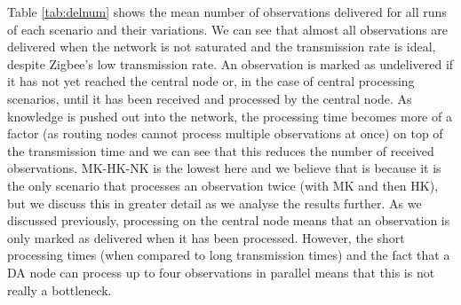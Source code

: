 Table \ref{tab:delnum} shows the mean number of observations delivered for all runs of each scenario and their variations. We can see that almost all observations are delivered when the network is not saturated and the transmission rate is ideal, despite Zigbee's low transmission rate. An observation is marked as undelivered if it has not yet reached the central node or, in the case of central processing scenarios, until it has been received and processed by the central node. As knowledge is pushed out into the network, the processing time becomes more of a factor (as routing nodes cannot process multiple observations at once) on top of the transmission time and we can see that this reduces the number of received observations. MK-HK-NK is the lowest here and we believe that is because it is the only scenario that processes an observation twice (with MK and then HK), but we discuss this in greater detail as we analyse the results further. As we discussed previously, processing on the central node means that an observation is only marked as delivered when it has been processed. However, the short processing times (when compared to long transmission times) and the fact that a DA node can process up to four observations in parallel means that this is not really a bottleneck.
 

